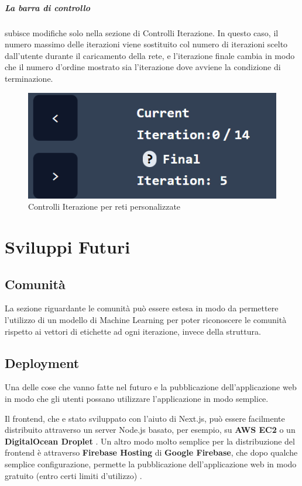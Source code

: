 \documentclass[a4paper,12pt]{report}
\begin{document}
\pagebreak

			\paragraph*{La barra di controllo} subisce modifiche solo nella sezione di Controlli Iterazione. In questo caso, il numero massimo delle iterazioni viene sostituito col numero di iterazioni scelto dall'utente durante il caricamento della rete, e l'iterazione finale cambia in modo che il numero d'ordine mostrato sia l'iterazione dove avviene la condizione di terminazione.

			\begin{center}
				\begin{figure}[H]
				\centering
				\includegraphics[width=0.5\linewidth]{iterationcontrolcustom}
				\caption{Controlli Iterazione per reti personalizzate}
				\end{figure}
			\end{center}
\chapter{Sviluppi Futuri}

	\section{Comunità}
	
	La sezione riguardante le comunità può essere estesa in modo da permettere l'utilizzo di un modello di Machine Learning per poter riconoscere le comunità rispetto ai vettori di etichette ad ogni iterazione, invece della struttura.

	\section{Deployment}

	Una delle cose che vanno fatte nel futuro e la pubblicazione dell'applicazione web in modo che gli utenti possano utilizzare l'applicazione in modo semplice.

	Il frontend, che e stato sviluppato con l'aiuto di Next.js, può essere facilmente distribuito attraverso un server Node.js basato, per esempio, su \textbf{AWS EC2} o un \textbf{DigitalOcean Droplet} \cite{nextjsdep}. Un altro modo molto semplice per la distribuzione del frontend è attraverso \textbf{Firebase Hosting} di \textbf{Google Firebase}, che dopo qualche semplice configurazione, permette la pubblicazione dell'applicazione web in modo gratuito (entro certi limiti d'utilizzo) \cite{firebasehosting}. 
\end{document}
